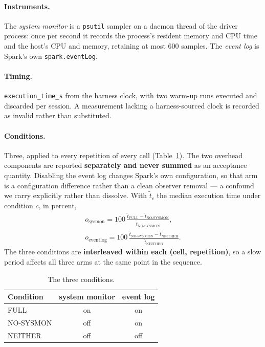 \documentclass[sigconf,review,anonymous]{acmart}
\begin{document}
\paragraph{Instruments.} The \emph{system monitor} is a \texttt{psutil} sampler on a daemon thread of
the driver process: once per second it records the process's resident memory and CPU time and the
host's CPU and memory, retaining at most 600 samples. The \emph{event log} is Spark's own
\texttt{spark.eventLog}.

\paragraph{Timing.} \texttt{execution\_time\_s} from the harness clock, with two warm-up runs executed and
discarded per session. A measurement lacking a harness-sourced clock is recorded as invalid
rather than substituted.

\paragraph{Conditions.} Three, applied to every repetition of every cell (Table~\ref{tab:conditions}).
The two overhead components are reported \textbf{separately and never summed} as an acceptance
quantity. Disabling the event log changes Spark's own configuration, so that arm is a
configuration difference rather than a clean observer removal --- a confound we carry explicitly
rather than dissolve.
With $\tilde t_c$ the median execution time under condition $c$, in percent,
\begin{gather*}
o_{\text{sysmon}} = 100\,\frac{\tilde t_{\text{FULL}} - \tilde t_{\text{NO-SYSMON}}}{\tilde t_{\text{NO-SYSMON}}},\\
o_{\text{eventlog}} = 100\,\frac{\tilde t_{\text{NO-SYSMON}} - \tilde t_{\text{NEITHER}}}{\tilde t_{\text{NEITHER}}}.
\end{gather*}
The three conditions are \textbf{interleaved within each (cell, repetition)}, so a slow period
affects all three arms at the same point in the sequence.

\begin{table}[t]
\caption{The three conditions.}\label{tab:conditions}
\small
\begin{tabular}{lcc}
\toprule
Condition & system monitor & event log \\
\midrule
FULL & on & on \\
NO-SYSMON & off & on \\
NEITHER & off & off \\
\bottomrule
\end{tabular}
\end{table}
\end{document}
